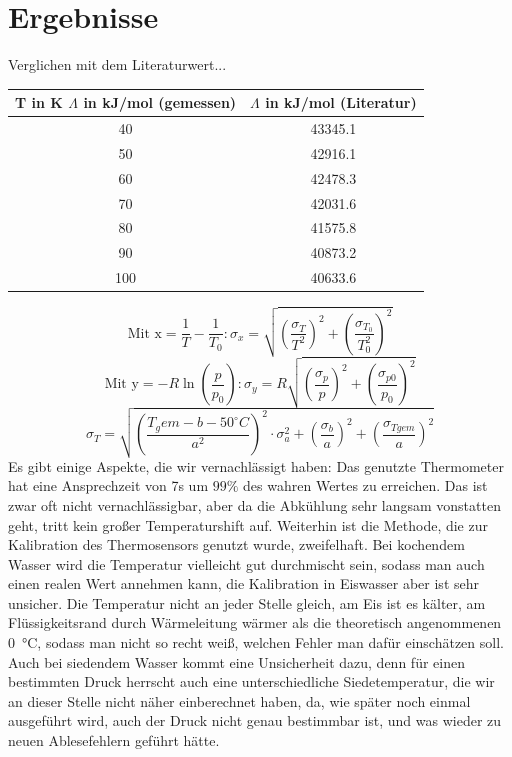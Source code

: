 \documentclass[]{article}
\begin{document}
	\section{Ergebnisse}
	{\color{red} Verglichen mit dem Literaturwert...}
	
	\begin{center}
		
		\begin{tabular}{|c|c|}
			\hline
			T in K  $\Lambda$ in kJ/mol (gemessen) &  $\Lambda$ in kJ/mol (Literatur)\\
			\hline
			\hline
			40 &  43345.1\\
			\hline
			50 &  42916.1\\
			\hline
			60 & 42478.3\\
			\hline
			70 &  42031.6\\
			\hline
			80 &41575.8\\
			\hline
			90 & 40873.2\\
			\hline
			100 & 40633.6\\
			\hline  			
		\end{tabular} 
	\end{center}
	\begin{equation}
	\text{Mit x} = \frac{1}{T} - \frac{1}{T_0}:
	\sigma_x = \sqrt{\left(\frac{\sigma_T}{T^2}\right)^2+\left(\frac{\sigma_T_0}{T_0^2}\right)^2}
	\end{equation}
	\begin{equation}
		\text{Mit y} = -R\ln\left(\frac{p}{p_0}\right):
		\sigma_y = R \sqrt{\left(\frac{\sigma_p}{p}\right)^2 +\left(\frac{\sigma_{p0}}{p_0}\right)^2 }
	\end{equation}
	\begin{equation}
		\sigma_T = \sqrt{\left(\frac{T_gem-b-50 ^{\circ}C}{a^2}\right)^2 \cdot \sigma_a^2 +\left(\frac{\sigma_b}{a}\right)^2 + \left(\frac{\sigma_{Tgem}}{a}\right)^2}
	\end{equation}
	Es gibt einige Aspekte, die wir vernachlässigt haben:
	Das genutzte Thermometer hat eine Ansprechzeit von 7s um $99\%$ des wahren Wertes zu erreichen. Das ist zwar oft nicht vernachlässigbar, aber da die Abkühlung sehr langsam vonstatten geht, tritt kein großer Temperaturshift auf.
	Weiterhin ist die Methode, die zur Kalibration des Thermosensors genutzt wurde, zweifelhaft. Bei kochendem Wasser wird die Temperatur vielleicht gut durchmischt sein, sodass man auch einen realen Wert annehmen kann, die Kalibration in Eiswasser aber ist sehr unsicher. Die Temperatur nicht an jeder Stelle gleich, am Eis ist es kälter, am Flüssigkeitsrand durch Wärmeleitung wärmer als die theoretisch angenommenen \SI{0}{\celsius}, sodass man nicht so recht weiß, welchen Fehler man dafür einschätzen soll. Auch bei siedendem Wasser kommt eine Unsicherheit dazu, denn für einen bestimmten Druck herrscht auch eine unterschiedliche Siedetemperatur, die wir an dieser Stelle nicht näher einberechnet haben, da, wie später noch einmal ausgeführt wird, auch der Druck nicht genau bestimmbar ist, und was wieder zu neuen Ablesefehlern geführt hätte.
\end{document}

